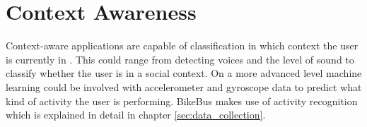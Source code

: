     
\section{Context Awareness}
\label{section:Mobile_Sensing_Context_Awareness}


Context-aware applications are capable of classification in which context the user is currently in \cite{Kjaergaard:2007:TRL:1777235.1777247}. This could range from detecting voices and the level of sound to classify whether the user is in a social context. On a more advanced level machine learning could be involved with accelerometer and gyroscope data to predict what kind of activity the user is performing. BikeBus makes use of activity recognition which is explained in detail in chapter \ref{sec:data_collection}.
